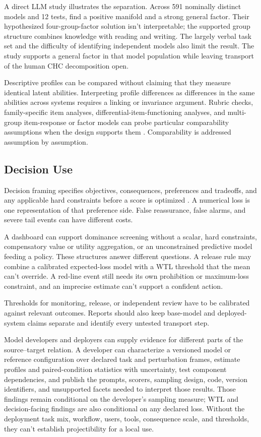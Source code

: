 \documentclass[12pt]{article}
\begin{document}
A direct LLM study illustrates the separation. Across 591 nominally distinct models and 12 tests, \textcite{ilicGignac2024cognitiveCapabilities} find a positive manifold and a strong general factor. Their hypothesized four-group-factor solution isn't interpretable; the supported group structure combines knowledge with reading and writing. The largely verbal task set and the difficulty of identifying independent models also limit the result. The study supports a general factor in that model population while leaving transport of the human CHC decomposition open.

Descriptive profiles can be compared without claiming that they measure identical latent abilities. Interpreting profile differences as differences in the same abilities across systems requires a linking or invariance argument. Rubric checks, family-specific item analyses, differential-item-functioning analyses, and multi-group item-response or factor models can probe particular comparability assumptions when the design supports them \citep{meredith1993measurementInvariance}. Comparability is addressed assumption by assumption.

\subsection{Decision Use}\label{ssec:decision_use}

Decision framing specifies objectives, consequences, preferences and tradeoffs, and any applicable hard constraints before a score is optimized \citep{KeeneyRaiffa1993}. A numerical loss is one representation of that preference side. False reassurance, false alarms, and severe tail events can have different costs.

A dashboard can support dominance screening without a scalar, hard constraints, compensatory value or utility aggregation, or an unconstrained predictive model feeding a policy. These structures answer different questions. A release rule may combine a calibrated expected-loss model with a WTL threshold that the mean can't override. A red-line event still needs its own prohibition or maximum-loss constraint, and an imprecise estimate can't support a confident action.

Thresholds for monitoring, release, or independent review have to be calibrated against relevant outcomes. Reports should also keep base-model and deployed-system claims separate and identify every untested transport step.

Model developers and deployers can supply evidence for different parts of the source--target relation. A developer can characterize a versioned model or reference configuration over declared task and perturbation frames, estimate profiles and paired-condition statistics with uncertainty, test component dependencies, and publish the prompts, scorers, sampling design, code, version identifiers, and unsupported facets needed to interpret those results. Those findings remain conditional on the developer's sampling measure; WTL and decision-facing findings are also conditional on any declared loss. Without the deployment task mix, workflow, users, tools, consequence scale, and thresholds, they can't establish projectibility for a local use.
\end{document}
